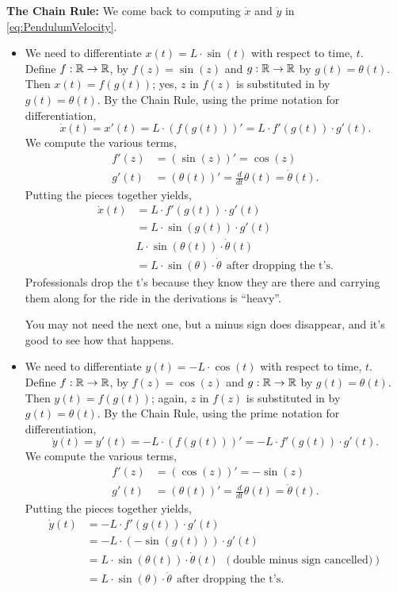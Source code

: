 \textbf{The Chain Rule:} We come back to computing $\dot{x}$ and $\dot{y}$ in \eqref{eq:PendulumVelocity}. 
\begin{itemize}
    \item We need to differentiate $x(t)= L \cdot \sin(t)$ with respect to time, $t$. \\
    
    Define $f:\mathbb R \to \mathbb R$, by $f(z) = \sin(z)$ and $g:\mathbb R \to \mathbb R$ by $g(t) = \theta(t)$. Then $x(t) = f(g(t))$; yes, $z$ in $f(z)$ is substituted in by $g(t) = \theta(t)$. By the Chain Rule, using the prime notation for differentiation,
    $$ \dot{x}(t) = x'(t) = L \cdot \left( f(g(t)) \right)' = L \cdot f'(g(t)) \cdot g'(t).$$
    We compute the various terms,
    \begin{align*}
        f'(z) & = (\sin(z))' = \cos(z) \\
        g'(t)& = (\theta(t))' = \frac{d}{dt} \theta(t) = \dot{\theta}(t).
    \end{align*}
    Putting the pieces together yields,
       \begin{align*}
        \dot{x}(t) & = L \cdot f'(g(t)) \cdot g'(t) \\
        &= L \cdot \sin(g(t)) \cdot g'(t)\\
        & L \cdot \sin(\theta(t)) \cdot \dot{\theta}(t) \\
        & = L \cdot \sin(\theta) \cdot \dot{\theta} ~~\text{after dropping the t's}.
    \end{align*}
    Professionals drop the t's because they know they are there and carrying them along for the ride in the derivations is ``heavy''.

    You may not need the next one, but a minus sign does disappear, and it's good to see how that happens.

    \item We need to differentiate $y(t)= -L \cdot \cos(t)$ with respect to time, $t$. \\ 
    
    Define $f:\mathbb R \to \mathbb R$, by $f(z) = \cos(z)$ and $g:\mathbb R \to \mathbb R$ by $g(t) = \theta(t)$. Then $y(t) = f(g(t))$; again, $z$ in $f(z)$ is substituted in by $g(t) = \theta(t)$. By the Chain Rule, using the prime notation for differentiation,
    $$ \dot{y}(t) = y'(t) = -L \cdot \left( f(g(t)) \right)' =- L \cdot f'(g(t)) \cdot g'(t).$$
    We compute the various terms,
    \begin{align*}
        f'(z) & = (\cos(z))' = - \sin(z) \\
        g'(t)& = (\theta(t))' = \frac{d}{dt} \theta(t) = \dot{\theta}(t).
    \end{align*}
    Putting the pieces together yields,
       \begin{align*}
        \dot{y}(t) & = - L \cdot f'(g(t)) \cdot g'(t) \\
        &= -L \cdot (- \sin(g(t)) ) \cdot g'(t)\\
        &= L \cdot \sin(\theta(t)) \cdot \dot{\theta}(t)  ~~(\text{double minus sign cancelled)})\\
        & = L \cdot \sin(\theta) \cdot \dot{\theta} ~~\text{after dropping the t's}.
    \end{align*}


\end{itemize}
